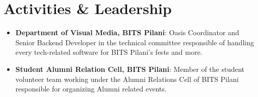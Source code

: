 \documentclass[a4paper,10pt]{extarticle} %
\begin{document}
\vspace{0.4cm}
\section{\textcolor{primary}{Activities \& Leadership}}

\begin{itemize}[leftmargin=0.55cm, rightmargin=0.2cm, label={\Large\textbullet}]
\vspace{0.2cm}
\item \textbf{Department of Visual Media, BITS Pilani}: Oasis Coordinator and Senior Backend Developer in the technical committee responsible of handling every tech-related software for BITS Pilani's fests and more. 

\item\textbf{Student Alumni Relation Cell, BITS Pilani}: Member of the student volunteer team working under the Alumni Relations Cell of BITS Pilani responsible for organizing Alumni related events.\\

\end{itemize}



\end{document}
